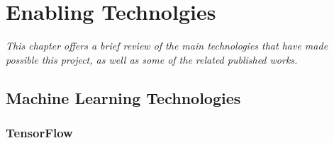 \chapter{Enabling Technolgies}
\label{chap:enabling_technologies}

\textit{This  chapter  offers  a  brief  review  of  the  main  technologies  that  have  made  possible this  project,  as  well  as  some of the related published works. }
\clearpage

\section{Machine Learning Technologies}

\subsection{TensorFlow}
